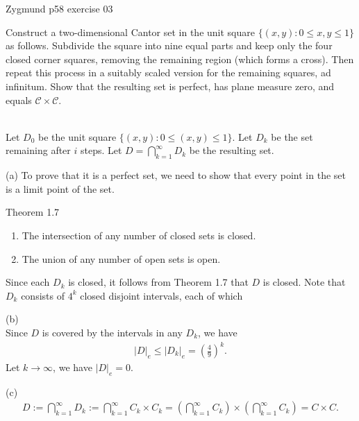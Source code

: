 \documentclass[UTF8,a4paper,10pt]{article}
\begin{document}
  \begin{Problem}[]{Zygmund p58 exercise 03}

    Construct a two-dimensional Cantor set in the unit square $\{(x, y) : 0 \leq x, y \leq 1\}$ as follows. Subdivide the square into nine equal parts and keep only the four closed corner squares, removing the remaining region (which forms a cross). Then repeat this process in a suitably scaled version for the remaining squares, ad infinitum. Show that the resulting set is perfect, has plane measure zero, and equals $\mathcal{C} \times \mathcal{C}$.
  
  \end{Problem}


  \begin{solution}\,\\
    Let \(D_0\) be the unit square \(\{(x,y): 0\leq (x,y)\leq 1\}\). Let \(D_k\) be the set remaining after \(i\) steps. Let \(D = \bigcap_{k=1}^{\infty} D_k \) be the resulting set.

    

    (a) To prove that it is a perfect set, we need to show that every point in the set is a limit point of the set.
    \begin{mybox}{Theorem 1.7}
      \begin{enumerate}[label=(\roman*)]
        \item The intersection of any number of closed sets is closed.
        \item The union of any number of open sets is open.
      \end{enumerate}
    \end{mybox}
    Since each \(D_k\) is closed, it follows from Theorem 1.7 that \(D\) is closed. Note that \(D_k\) consists of \(4^k\) closed disjoint intervals, each of which 


    (b)\\
    Since \(D\) is covered by the intervals in any \(D_k\), we have
    \begin{equation*}
      \begin{aligned}
        \left\lvert D\right\rvert_e \leq \left\lvert D_k \right\rvert_e = \left(\frac{4}{9}\right)^{k}.
      \end{aligned}
    \end{equation*}
    Let \(k\to\infty\), we have \(\left\lvert D\right\rvert_e = 0\).


    (c)
    \begin{equation*}
      \begin{aligned}
        D := \bigcap_{k=1}^{\infty} D_k := \bigcap_{k=1}^{\infty} C_k \times C_k =  \left(\bigcap_{k=1}^{\infty} C_k\right) \times \left(\bigcap_{k=1}^{\infty} C_k\right) = C\times C.
      \end{aligned}
    \end{equation*}


\end{solution}
\end{document}
